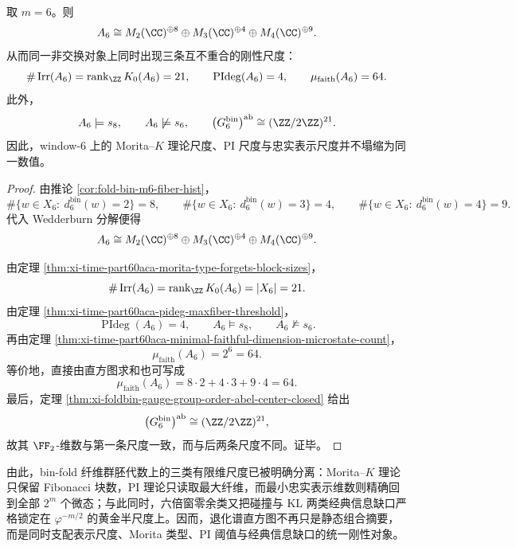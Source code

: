 \begin{theorem}\label{thm:xi-time-part60aca-window6-triple-rigidity-scales}
取 \(m=6\)。则
\[
A_6
\cong
M_2(\CC)^{\oplus 8}\oplus M_3(\CC)^{\oplus 4}\oplus M_4(\CC)^{\oplus 9}.
\]
从而同一非交换对象上同时出现三条互不重合的刚性尺度：
\[
\#\operatorname{Irr}(A_6)
=
\operatorname{rank}_{\ZZ}K_0(A_6)
=
21,
\qquad
\operatorname{PIdeg}(A_6)=4,
\qquad
\mu_{\mathrm{faith}}(A_6)=64.
\]
此外，
\[
A_6\models s_8,
\qquad
A_6\not\models s_6,
\qquad
\bigl(G_6^{\mathrm{bin}}\bigr)^{\mathrm{ab}}\cong (\ZZ/2\ZZ)^{21}.
\]
因此，window-\(6\) 上的 Morita--\(K\) 理论尺度、PI 尺度与忠实表示尺度并不塌缩为同一数值。
\end{theorem}
\begin{proof}
由推论 \ref{cor:fold-bin-m6-fiber-hist}，
\[
\#\{w\in X_6:\ d_6^{\mathrm{bin}}(w)=2\}=8,
\qquad
\#\{w\in X_6:\ d_6^{\mathrm{bin}}(w)=3\}=4,
\qquad
\#\{w\in X_6:\ d_6^{\mathrm{bin}}(w)=4\}=9.
\]
代入 Wedderburn 分解便得
\[
A_6
\cong
M_2(\CC)^{\oplus 8}\oplus M_3(\CC)^{\oplus 4}\oplus M_4(\CC)^{\oplus 9}.
\]

由定理 \ref{thm:xi-time-part60aca-morita-type-forgets-block-sizes}，
\[
\#\operatorname{Irr}(A_6)
=
\operatorname{rank}_{\ZZ}K_0(A_6)
=
|X_6|
=
21.
\]
由定理 \ref{thm:xi-time-part60aca-pideg-maxfiber-threshold}，
\[
\operatorname{PIdeg}(A_6)=4,
\qquad
A_6\models s_8,
\qquad
A_6\not\models s_6.
\]
再由定理 \ref{thm:xi-time-part60aca-minimal-faithful-dimension-microstate-count}，
\[
\mu_{\mathrm{faith}}(A_6)=2^6=64.
\]
等价地，直接由直方图求和也可写成
\[
\mu_{\mathrm{faith}}(A_6)
=
8\cdot 2+4\cdot 3+9\cdot 4
=
64.
\]
最后，定理 \ref{thm:xi-foldbin-gauge-group-order-abel-center-closed} 给出
\[
\bigl(G_6^{\mathrm{bin}}\bigr)^{\mathrm{ab}}\cong (\ZZ/2\ZZ)^{21},
\]
故其 \(\FF_2\)-维数与第一条尺度一致，而与后两条尺度不同。证毕。
\end{proof}

\noindent
由此，bin-fold 纤维群胚代数上的三类有限维尺度已被明确分离：Morita--\(K\) 理论只保留 Fibonacci 块数，PI 理论只读取最大纤维，而最小忠实表示维数则精确回到全部 \(2^m\) 个微态；与此同时，六倍窗零余类又把碰撞与 KL 两类经典信息缺口严格锁定在 \(\varphi^{-m/2}\) 的黄金半尺度上。因而，退化谱直方图不再只是静态组合摘要，而是同时支配表示尺度、Morita 类型、PI 阈值与经典信息缺口的统一刚性对象。

\endinput
